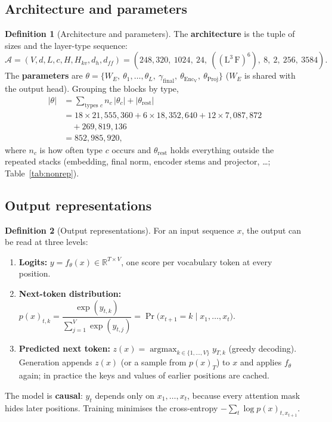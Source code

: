 \documentclass[10pt,a4paper]{article}
\newcommand{\op}[1]{\operatorname{#1}}
\theoremstyle{definition}
\newtheorem{definition}{Definition}[section]
\begin{document}
\subsection{Architecture and parameters}
\begin{definition}[Architecture and parameters]
The \textbf{architecture} is the tuple of sizes and the layer-type sequence:
\begin{equation}
  \mathcal{A} = (V,d,L,c,H,H_{kv},d_h,d_{ff}) = (248{,}320,\ 1024,\ 24,\ ((\mathrm{L}^{3}\,\mathrm{F})^{6}),\ 8,\ 2,\ 256,\ 3584).
\end{equation}
The \textbf{parameters} are $\theta=\{W_E,\ \theta_1,\dots,\theta_L,\ \gamma_{\mathrm{final}},\ \theta_{\op{Enc_V}},\ \theta_{\op{Proj}}\}$ ($W_E$ is shared with the output head). Grouping the blocks by type,
\begin{align*}
  |\theta| &= \sum_{\text{types } c} n_c\,|\theta_c| + |\theta_{\mathrm{rest}}| \\
  &= 18\times21{,}555{,}360 + 6\times18{,}352{,}640 + 12\times7{,}087{,}872 \\
  &\quad+ 269{,}819{,}136 \\
  &= 852{,}985{,}920,
\end{align*}
where $n_c$ is how often type $c$ occurs and $\theta_{\mathrm{rest}}$ holds everything outside the repeated stacks (embedding, final norm, encoder stems and projector, \dots; Table~\ref{tab:nonrep}).
\end{definition}
\subsection{Output representations}
\begin{definition}[Output representations]
For an input sequence $x$, the output can be read at three levels:
\begin{enumerate}
\item \textbf{Logits:} $y=f_\theta(x)\in\mathbb{R}^{T\times V}$, one score per vocabulary token at every position.
\item \textbf{Next-token distribution:} $p(x)_{t,k}=\dfrac{\exp(y_{t,k})}{\sum_{j=1}^{V}\exp(y_{t,j})}=\Pr\big(x_{t+1}=k\mid x_{1},\dots,x_{t}\big)$.
\item \textbf{Predicted next token:} $z(x)=\operatorname{argmax}_{k\in\{1,\dots,V\}} y_{T,k}$ (greedy decoding). Generation appends $z(x)$ (or a sample from $p(x)_{T}$) to $x$ and applies $f_\theta$ again; in practice the keys and values of earlier positions are cached.
\end{enumerate}
The model is \textbf{causal}: $y_t$ depends only on $x_1,\dots,x_t$, because every attention mask hides later positions. Training minimises the cross-entropy $-\sum_{t}\log p(x)_{t,x_{t+1}}$.
\end{definition}
\end{document}
